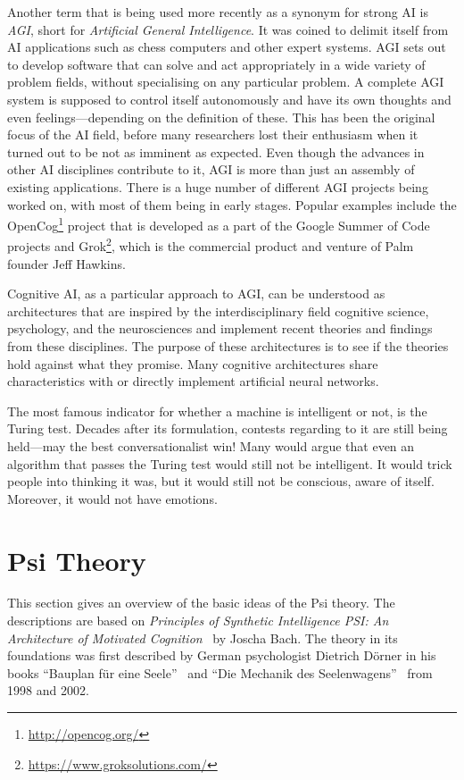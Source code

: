 Another term that is being used more recently as a synonym for strong AI is \emph{AGI}, short for \emph{Artificial General Intelligence}. It was coined to delimit itself from AI applications such as chess computers and other expert systems. AGI sets out to develop software that can solve and act appropriately in a wide variety of problem fields, without specialising on any particular problem. A complete AGI system is supposed to control itself autonomously and have its own thoughts and even feelings---depending on the definition of these. This has been the original focus of the AI field, before many researchers lost their enthusiasm when it turned out to be not as imminent as expected. Even though the advances in other AI disciplines contribute to it, AGI is more than just an assembly of existing applications. There is a huge number of different AGI projects being worked on, with most of them being in early stages. Popular examples include the OpenCog\footnote{\url{http://opencog.org/}} project that is developed as a part of the Google Summer of Code projects and Grok\footnote{\url{https://www.groksolutions.com/}}, which is the commercial product and venture of Palm founder Jeff Hawkins.~\cite{goertzel2007artificial} 

Cognitive AI, as a particular approach to AGI, can be understood as architectures that are inspired by the interdisciplinary field cognitive science, psychology, and the neurosciences and implement recent theories and findings from these disciplines. The purpose of these architectures is to see if the theories hold against what they promise. Many cognitive architectures share characteristics with or directly implement artificial neural networks.

The most famous indicator for whether a machine is intelligent or not, is the Turing test. Decades after its formulation, contests regarding to it are still being held---may the best conversationalist win! Many would argue that even an algorithm that passes the Turing test would still not be intelligent. It would trick people into thinking it was, but it would still not be conscious, aware of itself. Moreover, it would not have emotions.~\cite{russell2009artificial}

    \section{Psi Theory}

This section gives an overview of the basic ideas of the Psi theory. The descriptions are based on \emph{Principles of Synthetic Intelligence PSI: An Architecture of Motivated Cognition}~\cite{Bach:2009:PSI:1611304} by Joscha Bach. The theory in its foundations was first described by German psychologist Dietrich Dörner in his books ``Bauplan für eine Seele''~\cite{Doerner1998} and ``Die Mechanik des Seelenwagens''~\cite{dorner2002mechanik} from 1998 and 2002.

